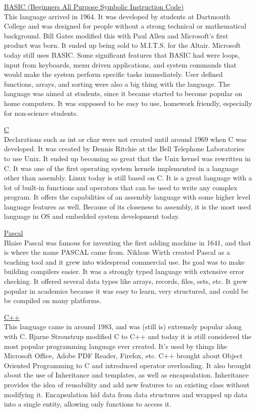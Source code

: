\documentclass[letterpaper, 10 pt, conference]{IEEEtran}
\begin{document}
\noindent \underline{BASIC (Beginners All Purpose Symbolic Instruction Code)}\\
This language arrived in 1964. It was developed by students at Dartmouth College and was designed for people without a strong technical or mathematical background. Bill Gates modified this with Paul Allen and Microsoft's first product was born. It ended up being sold to M.I.T.S. for the Altair. Microsoft today still uses BASIC. Some significant features that BASIC had were loops, input from keyboards, menu driven applications, and system commands that would make the system perform specific tasks immediately. User defined functions, arrays, and sorting were also a big thing with the language. The language was aimed at students, since it became started to become popular on home computers. It was supposed to be easy to use, homework friendly, especially for non-science students. \bigskip 

\noindent \underline{C}\\
Declarations such as int or char were not created until around 1969 when C was developed. It was created by Dennis Ritchie at the Bell Telephone Laboratories to use Unix. It ended up becoming so great that the Unix kernel was rewritten in C. It was one of the first operating system kernels implemented in a language other than assembly. Linux today is still based on C. It is a great language with a lot of built-in functions and operators that can be used to write any complex program. It offers the capabilities of an assembly language with some higher level language features as well. Because of its closeness to assembly, it is the most used language in OS and embedded system development today.\bigskip 

\noindent \underline{Pascal}\\
Blaise Pascal was famous for inventing the first adding machine in 1641, and that is where the name PASCAL came from. Niklaus Wirth created Pascal as a teaching tool and it grew into widespread commercial use. Its goal was to make building compilers easier. It was a strongly typed language with extensive error checking. It offered several data types like arrays, records, files, sets, etc. It grew popular in academics because it was easy to learn, very structured, and could be be compiled on many platforms.\bigskip

\noindent \underline{C++}\\
This language came in around 1983, and was (still is) extremely popular along with C. Bjarne Stroustrup modified C to C++ and today it is still considered the most popular programming language ever created. It's used by things like Microsoft Office, Adobe PDF Reader, Firefox, etc. C++ brought about Object Oriented Programming to C and introduced operator overloading. It also brought about the use of Inheritance and templates, as well as encapsulation. Inheritance provides the idea of reusability and add new features to an existing class without modifying it. Encapsulation hid data from data structures and wrapped up data into a single entity, allowing only functions to access it.\bigskip
\end{document}
